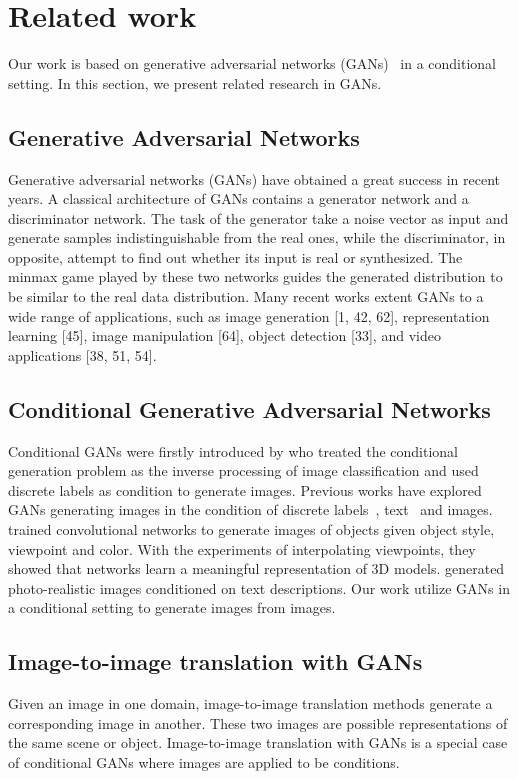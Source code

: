 \section{Related work}
Our work is based on generative adversarial networks (GANs)~\cite{GAN} in a conditional setting. In this section, we present related research in GANs.
\subsection{Generative Adversarial Networks}
Generative adversarial networks (GANs) \cite{GANs} have obtained a great success in recent years.
A classical architecture of GANs contains a generator network and a discriminator network. The task of the generator take a noise vector as input and generate samples indistinguishable from the real ones, while the discriminator, in opposite, attempt to find out whether its input is real or synthesized. The minmax game played by these two networks guides the generated distribution to be similar to the real data distribution. 
%
Many recent works extent GANs to a wide range of applications, such as image generation [1, 42, 62], representation learning [45], image manipulation [64], object detection [33], and video applications [38, 51, 54]. 

\subsection{Conditional Generative Adversarial Networks}
Conditional GANs were firstly introduced by \cite{CGAN} who treated the conditional generation problem as the inverse processing of image classification and used discrete labels as condition to generate images. Previous works have explored GANs generating images in the condition of discrete labels~\cite{CGAN}, text~\cite{Reed2016} and images.
%
\cite{Dosovitskiy2014} trained convolutional networks to generate images of objects given object style, viewpoint and color. With the experiments of interpolating viewpoints, they showed that networks learn a meaningful representation of 3D models. 
%
\cite{Reed2016} generated photo-realistic images conditioned on text descriptions. 
%
Our work utilize GANs in a conditional setting to generate images from images.


\subsection{Image-to-image translation with GANs}
Given an image in one domain, image-to-image translation methods generate a corresponding image in another. These two images are possible representations of the same scene or object. Image-to-image translation with GANs is a special case of conditional GANs where images are applied to be conditions. 
%

